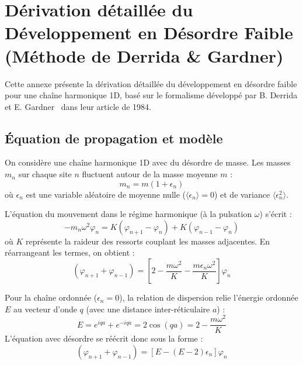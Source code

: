 \chapter{Dérivation détaillée du Développement en Désordre Faible (Méthode de Derrida \& Gardner)}\label{annexe:derrida-derivation}

Cette annexe présente la dérivation détaillée du développement en désordre faible pour une chaîne harmonique 1D, basé sur le formalisme développé par B. Derrida et E. Gardner~\cite{derrida1984lyapounov} dans leur article de 1984.

\section{Équation de propagation et modèle}

On considère une chaîne harmonique 1D avec du désordre de masse. Les masses $m_n$ sur chaque site $n$ fluctuent autour de la masse moyenne $m$ :
\begin{equation}
    m_n = m(1 + \epsilon_n)
\end{equation}
où $\epsilon_n$ est une variable aléatoire de moyenne nulle ($\langle\epsilon_n\rangle = 0$) et de variance $\langle\epsilon_n^2\rangle$.

L'équation du mouvement dans le régime harmonique (à la pulsation $\omega$) s'écrit :
\begin{equation}
    -m_n\omega^2\varphi_n = K(\varphi_{n+1} - \varphi_n) + K(\varphi_{n-1} - \varphi_n)
\end{equation}
où $K$ représente la raideur des ressorts couplant les masses adjacentes. En réarrangeant les termes, on obtient :
\begin{equation}
    (\varphi_{n+1} + \varphi_{n-1}) = \left[ 2 - \frac{m\omega^2}{K} - \frac{m\epsilon_n\omega^2}{K} \right] \varphi_n
\end{equation}

Pour la chaîne ordonnée ($\epsilon_n = 0$), la relation de dispersion relie l'énergie ordonnée $E$ au vecteur d'onde $q$ (avec une distance inter-réticulaire $a$) :
\begin{equation}
    E = e^{iqa} + e^{-iqa} = 2\cos(qa) = 2 - \frac{m\omega^2}{K}
\end{equation}
L'équation avec désordre se réécrit donc sous la forme :
\begin{equation}
    (\varphi_{n+1} + \varphi_{n-1}) = \left[ E - (E - 2)\epsilon_n \right] \varphi_n
\end{equation}


